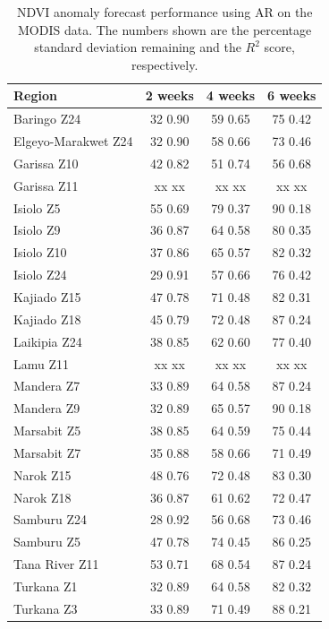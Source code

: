 \documentclass[review]{elsarticle}
\begin{document}
\begin{table}
	\footnotesize
	\caption{NDVI anomaly forecast performance using AR on the MODIS data. The numbers shown are the percentage standard deviation remaining and the $R^2$ score, respectively. } \label{tab:NDVI_MODIS}
	\centering
	\begin{tabular}{l|ccc} 
		\toprule
		\textbf{Region}  &  \textbf{2 weeks} &  \textbf{4 weeks}  & \textbf{6 weeks} \\
		\midrule
		Baringo Z24 & 32 	0.90 	& 59 	0.65&75 	0.42\\
		Elgeyo-Marakwet Z24 &  32 	0.90 &58 	0.66	&73 	0.46 		\\
		Garissa Z10 & 42 	0.82 &51 	0.74&56 	0.68	\\
		Garissa Z11 & xx xx & xx xx & xx xx  \\
		Isiolo Z5 & 55 	0.69&79 	0.37&90 	0.18 		 \\
		Isiolo Z9 &  36 	0.87&64 	0.58&80 	0.35 		\\
		Isiolo Z10 & 37 	0.86  &65 	0.57&82 	0.32 	\\
		Isiolo Z24 & 29 	0.91&57 	0.66&76 	0.42	\\
		Kajiado Z15 & 47 	0.78 & 71 	0.48 &82 	0.31 		\\
		Kajiado Z18& 45 	0.79&72 	0.48&87 	0.24\\
		Laikipia Z24 & 38 	0.85 	&62 	0.60&77 	0.40 		\\
		Lamu Z11 & xx xx & xx xx & xx xx \\
		Mandera Z7 & 33 	0.89&64 	0.58 &	87 	0.24 		\\
		Mandera Z9 & 32 	0.89&65 	0.57 &	90 	0.18 		\\
		Marsabit Z5 & 38 	0.85 &64 	0.59&75 	0.44 		\\
		Marsabit Z7 & 35 	0.88&	58 	0.66 &71 	0.49 			\\
		Narok Z15 & 48 	0.76& 72 	0.48 &83 	0.30 		 \\
		Narok Z18&36 	0.87 	& 61 	0.62&72 	0.47\\
		Samburu Z24 & 28 	0.92 	&56 	0.68&73 	0.46 		\\
		Samburu Z5 & 47 	0.78&74 	0.45 &	86 	0.25 		\\
		Tana River Z11& 53 	0.71 &68 	0.54&87 	0.24 		\\
		Turkana Z1 &  32 	0.89&	64 	0.58 &	82 	0.32 			\\
		Turkana Z3 & 33 	0.89&71 	0.49&88 	0.21 	\\

\end{tabular}
\end{table}
\end{document}
